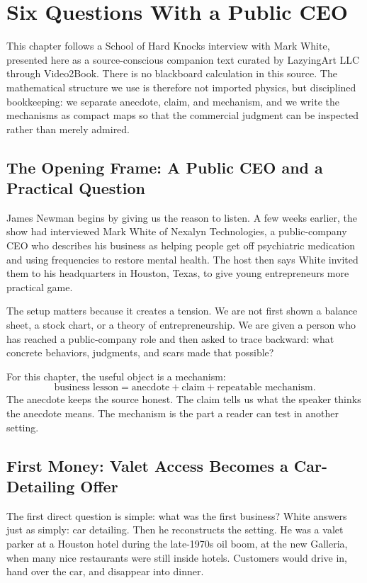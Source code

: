 \chapter{Six Questions With a Public CEO}

This chapter follows a School of Hard Knocks interview with Mark White, presented here as a source-conscious companion text curated by LazyingArt LLC through Video2Book. There is no blackboard calculation in this source. The mathematical structure we use is therefore not imported physics, but disciplined bookkeeping: we separate anecdote, claim, and mechanism, and we write the mechanisms as compact maps so that the commercial judgment can be inspected rather than merely admired.

\section{The Opening Frame: A Public CEO and a Practical Question}

James Newman begins by giving us the reason to listen. A few weeks earlier, the show had interviewed Mark White of Nexalyn Technologies, a public-company CEO who describes his business as helping people get off psychiatric medication and using frequencies to restore mental health. The host then says White invited them to his headquarters in Houston, Texas, to give young entrepreneurs more practical game.

The setup matters because it creates a tension. We are not first shown a balance sheet, a stock chart, or a theory of entrepreneurship. We are given a person who has reached a public-company role and then asked to trace backward: what concrete behaviors, judgments, and scars made that possible?

For this chapter, the useful object is a mechanism:
\begin{equation}
\text{business lesson}
=
\text{anecdote}
+
\text{claim}
+
\text{repeatable mechanism}.
\end{equation}
The anecdote keeps the source honest. The claim tells us what the speaker thinks the anecdote means. The mechanism is the part a reader can test in another setting.

\section{First Money: Valet Access Becomes a Car-Detailing Offer}

The first direct question is simple: what was the first business? White answers just as simply: car detailing. Then he reconstructs the setting. He was a valet parker at a Houston hotel during the late-1970s oil boom, at the new Galleria, when many nice restaurants were still inside hotels. Customers would drive in, hand over the car, and disappear into dinner.


